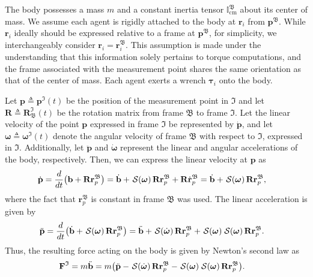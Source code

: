 The body possesses a mass $m$ and a constant inertia tensor $\mathbb{I}_\text{cm}^\mathfrak{B}$ about its center of mass. We assume each agent is rigidly attached to the body at $\mathbf{r}_i$ from $\mathbf{p}^\mathfrak{B}$. While $\mathbf{r}_i$ ideally should be expressed relative to a frame at $\mathbf{p}^\mathfrak{B}$, for simplicity, we interchangeably consider $\mathbf{r}_i= \mathbf{r}_i^\mathfrak{B}$. This assumption is made under the understanding that this information solely pertains to torque computations, and the frame associated with the measurement point shares the same orientation as that of the center of mass. Each agent exerts a wrench $\boldsymbol{\tau}_i$ onto the body.


Let $\mathbf{p}\triangleq\mathbf{p}^\mathfrak{I}(t)$ be the position of the measurement point in $\mathfrak{I}$ and let $\mathbf{R}\triangleq \mathbf{R}_\mathfrak{B}^\mathfrak{I}(t)$ be the rotation matrix from frame $\mathfrak{B}$ to frame $\mathfrak{I}$. Let the linear velocity of the point $\mathbf{p}$ expressed in frame $\mathfrak{I}$ be represented by $\dot{\mathbf{p}}$, and let $\boldsymbol{\omega}\triangleq\boldsymbol{\omega}^\mathfrak{I}(t)$ denote the angular velocity of frame $\mathfrak{B}$ with respect to $\mathfrak{I}$, expressed in $\mathfrak{I}$. Additionally, let $\ddot{\mathbf{p}}$ and $\dot{\boldsymbol{\omega}}$ represent the linear and angular accelerations of the body, respectively. Then, we can express the linear velocity at $\mathbf{p}$ as
\begin{align}
    \dot{\mathbf{p}} &= \frac{d}{dt}\bigl(\mathbf{b} + \mathbf{R}\mathbf{r}^\mathfrak{B}_p\bigr) 
    = \dot{\mathbf{b}} +\SL[\boldsymbol{\omega}]\mathbf{R}\mathbf{r}^\mathfrak{B}_p + \mathbf{R}\dot{\mathbf{r}}^\mathfrak{B}_p = \dot{\mathbf{b}} +\SL[\boldsymbol{\omega}]\mathbf{R}\mathbf{r}^\mathfrak{B}_p,
\end{align}
where the fact that $\mathbf{r}^\mathfrak{B}_p$ is constant in frame $\mathfrak{B}$ was used. The linear acceleration is given by
\begin{align}
    \ddot{\mathbf{p}} &= \frac{d}{dt}\bigl(\dot{\mathbf{b}} +\SL[\boldsymbol{\omega}]\mathbf{R}\mathbf{r}^\mathfrak{B}_p\bigr) 
    = \ddot{\mathbf{b}} + \SL[\dot{\boldsymbol{\omega}}]\mathbf{R}\mathbf{r}^\mathfrak{B}_p + \SL[\boldsymbol{\omega}]\SL[\boldsymbol{\omega}]\mathbf{R}\mathbf{r}^\mathfrak{B}_p.
\end{align}
Thus, the resulting force acting on the body is given by Newton's second law as
\begin{align}
    \mathbf{F}^\mathfrak{I}&=m\ddot{\mathbf{b}} = m\bigl(\ddot{\mathbf{p}} - \SL[\dot{\boldsymbol{\omega}}]\mathbf{R}\mathbf{r}^\mathfrak{B}_p - \SL[\boldsymbol{\omega}]\SL[\boldsymbol{\omega}]\mathbf{R}\mathbf{r}^\mathfrak{B}_p\bigr).
\end{align}
